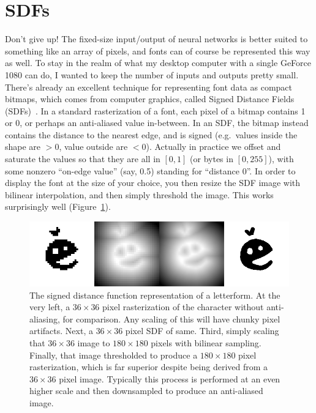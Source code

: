 \documentclass[twocolumn]{article}
\begin{document}




\section{SDFs}

Don't give up! The fixed-size input/output of neural networks is
better suited to something like an array of pixels, and fonts can of
course be represented this way as well. To stay in the realm of what
my desktop computer with a single GeForce 1080 can do, I wanted to
keep the number of inputs and outputs pretty small. There's already an
excellent technique for representing font data as compact bitmaps,
which comes from computer graphics, called Signed Distance Fields
(SDFs)~\cite{green2007improved}. In a standard rasterization of a
font, each pixel of a bitmap contains 1 or 0, or perhaps an
anti-aliased value in-between. In an SDF, the bitmap instead contains
the distance to the nearest edge, and is signed (e.g.~values inside
the shape are $> 0$, value outside are $< 0$). Actually in
practice we offset and saturate the values so that they are all in
$[0,1]$ (or bytes in $[0,255]$), with some nonzero ``on-edge value''
(say, 0.5) standing for ``distance 0''. In order to display the font
at the size of your choice, you then resize the SDF image with bilinear
interpolation, and then simply threshold the image. This works
surprisingly well (Figure~\ref{fig:sdf}).

\begin{figure}[ht]
\centering
  \includegraphics[width=0.95 \linewidth]{sdf-figure}
\caption{
  The signed distance function representation of a letterform.
  At the very left, a $36\times 36$ pixel rasterization of
  the character without anti-aliasing, for comparison. Any
  scaling of this will have chunky pixel artifacts. Next,
  a $36\times 36$ pixel SDF of same. Third, simply scaling
  that $36\times 36$ image to $180 \times 180$ pixels with
  bilinear sampling. Finally, that image thresholded to
  produce a $180 \times 180$ pixel rasterization, which is
  far superior despite being derived from a $36 \times 36$ pixel
  image. Typically this process is performed at an even higher
  scale and then downsampled to produce an anti-aliased image.
} \label{fig:sdf}
\end{figure}
\end{document}
